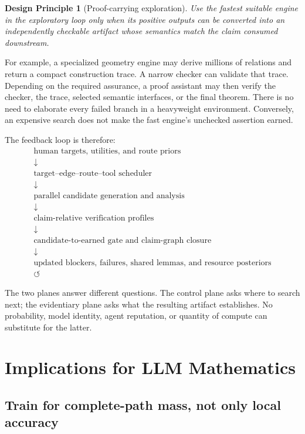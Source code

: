 \documentclass[11pt]{article}
\newtheorem{principle}[definition]{Design Principle}
\begin{document}
\begin{principle}[Proof-carrying exploration]\label{prn:proof-carrying}
Use the fastest suitable engine in the exploratory loop only when its positive
outputs can be converted into an independently checkable artifact whose
semantics match the claim consumed downstream.
\end{principle}

For example, a specialized geometry engine may derive millions of relations
and return a compact construction trace.  A narrow checker can validate that
trace.  Depending on the required assurance, a proof assistant may then verify
the checker, the trace, selected semantic interfaces, or the final theorem.
There is no need to elaborate every failed branch in a heavyweight
environment.  Conversely, an expensive search does not make the fast engine's
unchecked assertion earned.

The feedback loop is therefore:
\[
\begin{array}{c}
\text{human targets, utilities, and route priors}\\
\downarrow\\
\text{target--edge--route--tool scheduler}\\
\downarrow\\
\text{parallel candidate generation and analysis}\\
\downarrow\\
\text{claim-relative verification profiles}\\
\downarrow\\
\text{candidate-to-earned gate and claim-graph closure}\\
\downarrow\\
\text{updated blockers, failures, shared lemmas, and resource posteriors}\\
\circlearrowleft
\end{array}
\]

The two planes answer different questions.  The control plane asks where to
search next; the evidentiary plane asks what the resulting artifact
establishes.  No probability, model identity, agent reputation, or quantity of
compute can substitute for the latter.

\section{Implications for LLM Mathematics}

\subsection{Train for complete-path mass, not only local accuracy}
\end{document}
